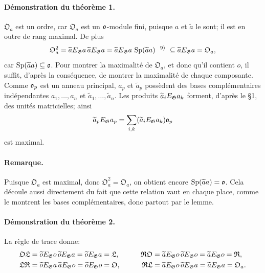 \paragraph{Démonstration du théorème 1.}
\(\mathfrak O_a\) est un ordre, car \(\mathfrak O_a\) est un \(\mathfrak o\)-module fini, puisque \(a\) et \(\widetilde a\) le sont; il est en outre de rang maximal. De plus
\[
        \mathfrak O_a^2
        =\widetilde aE_\Gg a\,\widetilde aE_\Gg a
        =\widetilde aE_\Gg a\,\Sp(\widetilde a a)\text{\srcfnmark{9)}}
        \subseteq \widetilde aE_\Gg a=\mathfrak O_a,
\]
car \(\operatorname{Sp}(\widetilde a a)\subseteq\mathfrak o\). Pour montrer la maximalité de \(\mathfrak O_a\), et donc qu'il contient \(o\), il suffit, d'après la conséquence, de montrer la maximalité de chaque composante. Comme \(\mathfrak o_p\) est un anneau principal, \(a_p\) et \(\widetilde a_p\) possèdent des bases complémentaires indépendantes \(a_1,\ldots,a_n\) et \(\widetilde a_1,\ldots,\widetilde a_n\). Les produits \(\widetilde a_iE_\mathfrak G a_k\) forment, d'après le \S{}1, des unités matricielles; ainsi
\[
        \widetilde a_pE_\mathfrak G a_p
        =\sum_{i,k}(\widetilde a_iE_\mathfrak G a_k)\mathfrak o_p
\]
est maximal.

\paragraph{Remarque.}
Puisque \(\mathfrak O_a\) est maximal, donc \(\mathfrak O_a^2=\mathfrak O_a\), on obtient encore \(\operatorname{Sp}(\widetilde a a)=\mathfrak o\). Cela découle aussi directement du fait que cette relation vaut en chaque place, comme le montrent les bases complémentaires, donc partout par le lemme.

\paragraph{Démonstration du théorème 2.}
La règle de trace donne:
\[
\begin{aligned}
 \mathfrak O\mathfrak L
 &=\widetilde oE_\mathfrak G o\,\widetilde oE_\mathfrak G a
 =\widetilde oE_\mathfrak G a=\mathfrak L,
&\qquad
 \mathfrak R\mathfrak O
 &=\widetilde aE_\mathfrak G o\,\widetilde oE_\mathfrak G o
 =\widetilde aE_\mathfrak G o=\mathfrak R,\\
 \mathfrak L\mathfrak R
 &=\widetilde oE_\mathfrak G a\,\widetilde aE_\mathfrak G o
 =\widetilde oE_\mathfrak G o=\mathfrak O,
&
 \mathfrak R\mathfrak L
 &=\widetilde aE_\mathfrak G o\,\widetilde oE_\mathfrak G a
 =\widetilde aE_\mathfrak G a=\mathfrak O_a.
\end{aligned}
\]

